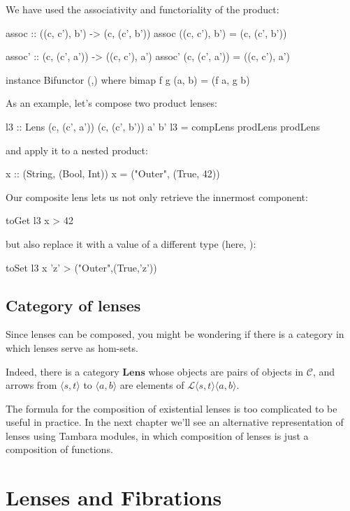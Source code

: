 \documentclass[DaoFP]{subfiles}
\begin{document}
We have used the associativity and functoriality of the product:
\begin{haskell}
assoc :: ((c, c'), b') -> (c, (c', b'))
assoc ((c, c'), b') = (c, (c', b'))

assoc' :: (c, (c', a')) -> ((c, c'), a')
assoc' (c, (c', a')) = ((c, c'), a')

instance Bifunctor (,) where
  bimap f g (a, b) = (f a, g b)
\end{haskell}

As an example, let's compose two product lenses:
\begin{haskell}
l3 :: Lens (c, (c', a')) (c, (c', b')) a' b'
l3 = compLens prodLens prodLens
\end{haskell}
and apply it to a nested product:
\begin{haskell}
x :: (String, (Bool, Int))
x = ("Outer", (True, 42))
\end{haskell}
Our composite lens lets us not only retrieve the innermost component:
\begin{haskell}
toGet l3 x
> 42
\end{haskell}
but also replace it with a value of a different type (here, ):
\begin{haskell}
toSet l3 x 'z'
> ("Outer",(True,'z'))
\end{haskell}

\subsection{Category of lenses}

Since lenses can be composed, you might be wondering if there is a category in which lenses serve as hom-sets. 

Indeed, there is a category $\mathbf{Lens}$ whose objects are pairs of objects in $\mathcal{C}$, and arrows from $\langle s, t\rangle$ to $ \langle a, b \rangle$ are elements of  $\mathcal{L} \langle s, t\rangle \langle a, b \rangle$.

The formula for the composition of existential lenses is too complicated to be useful in practice. In the next chapter we'll see an alternative representation of lenses using Tambara modules, in which composition of lenses is just a composition of functions.

\section{Lenses and Fibrations}
\end{document}
